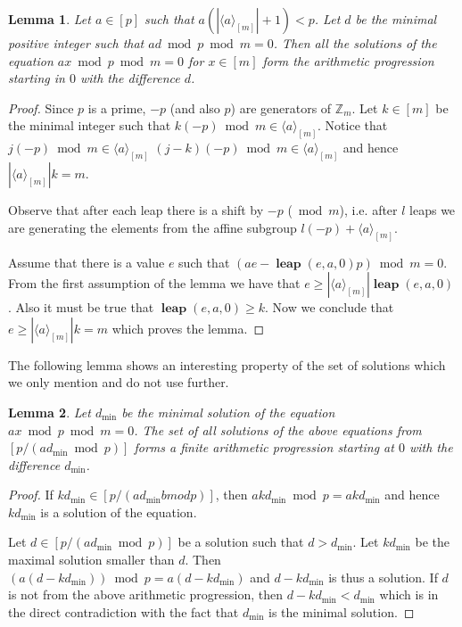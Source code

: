 \documentclass{article}
\newcommand{\leap}[3]{\operatorname{\mathbf{leap}}({#1}, {#2}, {#3})}
\newtheorem{lemma}{Lemma}
\begin{document}
\begin{lemma}
Let $a \in [p]$ such that $a (|\langle a \rangle_{[m]}| + 1) < p$. Let $d$ be the minimal positive integer such that $ad \bmod p \bmod m = 0$.
Then all the solutions of the equation $ax \bmod p \bmod m = 0$ for $x \in [m]$ form the arithmetic progression starting in $0$ with the difference $d$.
\end{lemma}
\begin{proof}
Since $p$ is a prime, $-p$ (and also $p$) are generators of $\mathbb{Z}_{m}$.
Let $k \in [m]$ be the minimal integer such that $k(-p) \bmod m \in \langle a \rangle_{[m]}$.
Notice that $j(-p) \bmod m \in \langle a \rangle_{[m]}$ $(j - k)(-p) \bmod m \in \langle a \rangle_{[m]}$ and hence $|\langle a \rangle_{[m]}| k = m$.

Observe that after each leap there is a shift by $-p$ ($\bmod m$), i.e. after $l$ leaps we are generating the elements from the affine subgroup $l(-p) + \langle a \rangle_{[m]}$.

Assume that there is a value $e$ such that $(ae - \leap{e}{a}{0}p) \bmod m = 0$.
From the first assumption of the lemma we have that $e \geq |\langle a \rangle_{[m]}| \leap{e}{a}{0}$.
Also it must be true that $\leap{e}{a}{0} \geq k$.
Now we conclude that $e \geq |\langle a \rangle_{[m]}| k = m$ which proves the lemma.
\end{proof}

The following lemma shows an interesting property of the set of solutions which we only mention and do not use further.
\begin{lemma}
Let $d_{\operatorname{min}}$ be the minimal solution of the equation $ax \bmod p \bmod m = 0$.
The set of all solutions of the above equations from $[p / ({a d_{\operatorname{min}}} \bmod p)]$ forms a finite arithmetic progression starting at $0$ with the difference $d_{\operatorname{min}}$.
\end{lemma}
\begin{proof}
If $k d_{\operatorname{min}} \in [p / (a d_{\operatorname{min}}  bmod p)]$, then $a k d_{\operatorname{min}} \bmod p = akd_{\operatorname{min}}$ and hence $k d_{\operatorname{min}}$ is a solution of the equation.

Let $d \in [p / (a d_{\operatorname{min}} \bmod p)]$ be a solution such that $d > d_{\operatorname{min}}$. Let $k d_{\operatorname{min}}$ be the maximal solution smaller than $d$. Then $(a(d - kd_{\operatorname{min}})) \bmod p = a(d - kd_{\operatorname{min}})$ and $d - kd_{\operatorname{min}}$ is thus a solution. 
If $d$ is not from the above arithmetic progression, then $d - 
kd_{\operatorname{min}} < d_{\operatorname{min}}$ which is in the direct 
contradiction with the fact that $d_{\operatorname{min}}$ is the minimal 
solution.
\end{proof}
\end{document}
